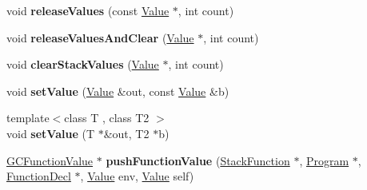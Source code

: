 \begin{DoxyCompactItemize}
\item 
void {\bfseries release\+Values} (const \hyperlink{struct_object_script_1_1_o_s_1_1_core_1_1_value}{Value} $\ast$, int count)\hypertarget{class_object_script_1_1_o_s_1_1_core_ac25ad654941196f1cdc9dad9cd09a56e}{}\label{class_object_script_1_1_o_s_1_1_core_ac25ad654941196f1cdc9dad9cd09a56e}

\item 
void {\bfseries release\+Values\+And\+Clear} (\hyperlink{struct_object_script_1_1_o_s_1_1_core_1_1_value}{Value} $\ast$, int count)\hypertarget{class_object_script_1_1_o_s_1_1_core_a6641f8c7c01fbaf5589acaa422f072d6}{}\label{class_object_script_1_1_o_s_1_1_core_a6641f8c7c01fbaf5589acaa422f072d6}

\item 
void {\bfseries clear\+Stack\+Values} (\hyperlink{struct_object_script_1_1_o_s_1_1_core_1_1_value}{Value} $\ast$, int count)\hypertarget{class_object_script_1_1_o_s_1_1_core_ac5de64014ab2cb9cc5b2a57ad17b48b2}{}\label{class_object_script_1_1_o_s_1_1_core_ac5de64014ab2cb9cc5b2a57ad17b48b2}

\item 
void {\bfseries set\+Value} (\hyperlink{struct_object_script_1_1_o_s_1_1_core_1_1_value}{Value} \&out, const \hyperlink{struct_object_script_1_1_o_s_1_1_core_1_1_value}{Value} \&b)\hypertarget{class_object_script_1_1_o_s_1_1_core_ab8feba32f05c128709598689870f72ea}{}\label{class_object_script_1_1_o_s_1_1_core_ab8feba32f05c128709598689870f72ea}

\item 
{\footnotesize template$<$class T , class T2 $>$ }\\void {\bfseries set\+Value} (T $\ast$\&out, T2 $\ast$b)\hypertarget{class_object_script_1_1_o_s_1_1_core_ae985d46e1821fc5545303eced4dd8adf}{}\label{class_object_script_1_1_o_s_1_1_core_ae985d46e1821fc5545303eced4dd8adf}

\item 
\hyperlink{struct_object_script_1_1_o_s_1_1_core_1_1_g_c_function_value}{G\+C\+Function\+Value} $\ast$ {\bfseries push\+Function\+Value} (\hyperlink{struct_object_script_1_1_o_s_1_1_core_1_1_stack_function}{Stack\+Function} $\ast$, \hyperlink{class_object_script_1_1_o_s_1_1_core_1_1_program}{Program} $\ast$, \hyperlink{struct_object_script_1_1_o_s_1_1_core_1_1_function_decl}{Function\+Decl} $\ast$, \hyperlink{struct_object_script_1_1_o_s_1_1_core_1_1_value}{Value} env, \hyperlink{struct_object_script_1_1_o_s_1_1_core_1_1_value}{Value} self)\hypertarget{class_object_script_1_1_o_s_1_1_core_ac76427f4c885e01d84d12b841e048191}{}\label{class_object_script_1_1_o_s_1_1_core_ac76427f4c885e01d84d12b841e048191}


\end{DoxyCompactItemize}
